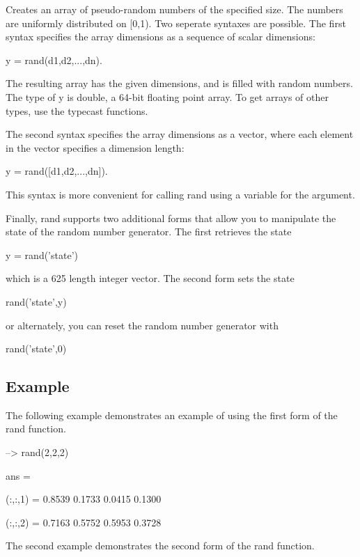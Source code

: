 Creates an array of pseudo-\/random numbers of the specified size. The numbers are uniformly distributed on {\ttfamily \mbox{[}0,1)}. Two seperate syntaxes are possible. The first syntax specifies the array dimensions as a sequence of scalar dimensions\-: \begin{DoxyVerb}  y = rand(d1,d2,...,dn).
\end{DoxyVerb}
 The resulting array has the given dimensions, and is filled with random numbers. The type of {\ttfamily y} is {\ttfamily double}, a 64-\/bit floating point array. To get arrays of other types, use the typecast functions.

The second syntax specifies the array dimensions as a vector, where each element in the vector specifies a dimension length\-: \begin{DoxyVerb}  y = rand([d1,d2,...,dn]).
\end{DoxyVerb}
 This syntax is more convenient for calling {\ttfamily rand} using a variable for the argument.

Finally, {\ttfamily rand} supports two additional forms that allow you to manipulate the state of the random number generator. The first retrieves the state \begin{DoxyVerb}  y = rand('state')
\end{DoxyVerb}
 which is a 625 length integer vector. The second form sets the state \begin{DoxyVerb}  rand('state',y)
\end{DoxyVerb}
 or alternately, you can reset the random number generator with \begin{DoxyVerb}  rand('state',0)
\end{DoxyVerb}
 \hypertarget{variables_struct_Example}{}\subsection{Example}\label{variables_struct_Example}
The following example demonstrates an example of using the first form of the {\ttfamily rand} function.


\begin{DoxyVerbInclude}
--> rand(2,2,2)

ans = 

(:,:,1) = 
    0.8539    0.1733 
    0.0415    0.1300 

(:,:,2) = 
    0.7163    0.5752 
    0.5953    0.3728 
\end{DoxyVerbInclude}


The second example demonstrates the second form of the {\ttfamily rand} function.


